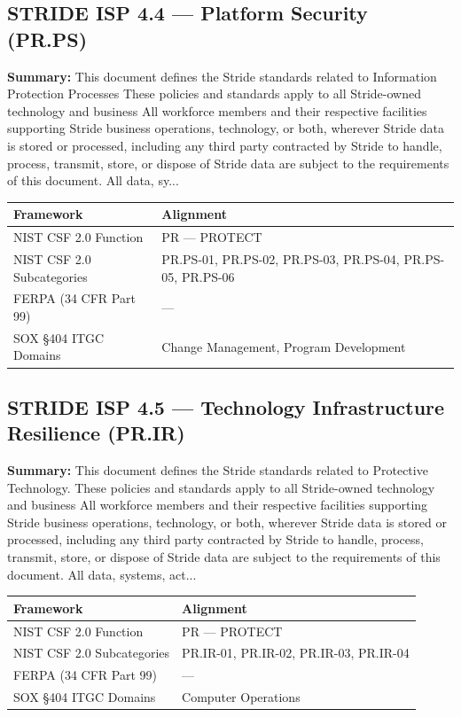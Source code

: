 \documentclass[11pt,landscape]{article}
\begin{document}
\subsection{\textcolor{strideblue}{STRIDE ISP 4.4} --- Platform Security (PR.PS)}
\label{pol:ISP44}

\textbf{Summary:} This document defines the Stride standards related to Information Protection Processes These policies and standards apply to all Stride-owned technology and business All workforce members and their respective facilities supporting Stride business operations, technology, or both, wherever Stride data is stored or processed, including any third party contracted by Stride to handle, process, transmit, store, or dispose of Stride data are subject to the requirements of this document. All data, sy...

\begin{tabularx}{\textwidth}{|p{4cm}|X|}
\hline
\rowcolor{headgray} \textbf{Framework} & \textbf{Alignment} \\
\hline
NIST CSF 2.0 Function & PR --- PROTECT \\
\hline
NIST CSF 2.0 Subcategories & PR.PS-01, PR.PS-02, PR.PS-03, PR.PS-04, PR.PS-05, PR.PS-06 \\
\hline
FERPA (34 CFR Part 99) & --- \\
\hline
SOX §404 ITGC Domains & Change Management, Program Development \\
\hline
\end{tabularx}


\subsection{\textcolor{strideblue}{STRIDE ISP 4.5} --- Technology Infrastructure Resilience (PR.IR)}
\label{pol:ISP45}

\textbf{Summary:} This document defines the Stride standards related to Protective Technology. These policies and standards apply to all Stride-owned technology and business All workforce members and their respective facilities supporting Stride business operations, technology, or both, wherever Stride data is stored or processed, including any third party contracted by Stride to handle, process, transmit, store, or dispose of Stride data are subject to the requirements of this document. All data, systems, act...

\begin{tabularx}{\textwidth}{|p{4cm}|X|}
\hline
\rowcolor{headgray} \textbf{Framework} & \textbf{Alignment} \\
\hline
NIST CSF 2.0 Function & PR --- PROTECT \\
\hline
NIST CSF 2.0 Subcategories & PR.IR-01, PR.IR-02, PR.IR-03, PR.IR-04 \\
\hline
FERPA (34 CFR Part 99) & --- \\
\hline
SOX §404 ITGC Domains & Computer Operations \\
\hline
\end{tabularx}
\end{document}
